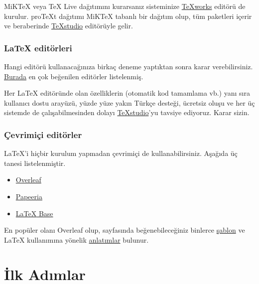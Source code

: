 \documentclass[
  letterpaper,
  DIV=11,
  numbers=noendperiod]{scrreprt}
\providecommand{\tightlist}{%
  \setlength{\itemsep}{0pt}\setlength{\parskip}{0pt}}\usepackage{longtable,booktabs,array}
\begin{document}
MiKTeX veya TeX Live dağıtımını kurarsanız sisteminize
\href{https://www.tug.org/texworks/}{TeXworks} editörü de kurulur.
proTeXt dağıtımı MiKTeX tabanlı bir dağıtım olup, tüm paketleri içerir
ve beraberinde \href{https://texstudio.org/}{TeXstudio} editörüyle
gelir.

\hypertarget{latex-edituxf6rleri}{%
\subsection{\texorpdfstring{{\LaTeX}
editörleri}{ editörleri}}\label{latex-edituxf6rleri}}

Hangi editörü kullanacağınıza birkaç deneme yaptıktan sonra karar
verebilirsiniz. \href{https://beebom.com/best-latex-editors/}{Burada} en
çok beğenilen editörler listelenmiş.

Her {\LaTeX} editöründe olan özelliklerin (otomatik kod tamamlama vb.)
yanı sıra kullanıcı dostu arayüzü, yüzde yüze yakın Türkçe desteği,
ücretsiz oluşu ve her üç sistemde de çalışabilmesinden dolayı
\href{https://texstudio.org/}{TeXstudio}'yu tavsiye ediyoruz. Karar
sizin.

\hypertarget{uxe7evrimiuxe7i-edituxf6rler}{%
\subsection{Çevrimiçi editörler}\label{uxe7evrimiuxe7i-edituxf6rler}}

{\LaTeX}'i hiçbir kurulum yapmadan çevrimiçi de kullanabilirsiniz.
Aşağıda üç tanesi listelenmiştir.

\begin{itemize}
\tightlist
\item
  \href{https://www.overleaf.com/}{Overleaf}
\item
  \href{https://papeeria.com/}{Papeeria}
\item
  \href{https://latexbase.com/}{{\LaTeX} Base}
\end{itemize}

En popüler olanı Overleaf olup, sayfasında beğenebileceğiniz binlerce
\href{https://www.overleaf.com/latex/templates}{şablon} ve {\LaTeX}
kullanımına yönelik \href{https://www.overleaf.com/learn}{anlatımlar}
bulunur.


\hypertarget{ilk-adux131mlar}{%
\chapter{İlk Adımlar}\label{ilk-adux131mlar}}
\end{document}
